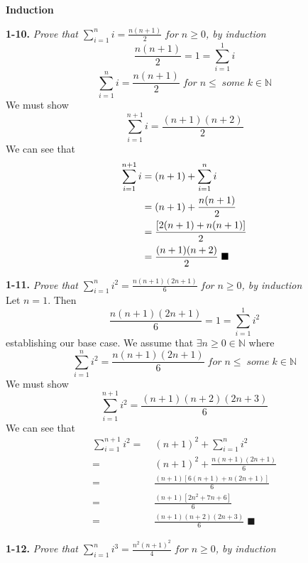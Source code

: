 \textbf{Induction}

\textbf{1-10.} \emph{Prove that $\sum_{i=1}^{n}i=\frac{n(n+1)}{2} \;for\; n \geq 0$, by induction} \\
\textcolor{answer}{
	$$\frac{n(n+1)}{2} = 1 = \sum_{i=1}^{1} i$$
	$$\sum_{i=1}^{n} i = \frac{n(n+1)}{2} \;for\; n \leq \;some\; k \in \mathbb{N}$$
	We must show
	$$\sum_{i=1}^{n+1} i = \frac{(n+1)(n+2)}{2}$$
	We can see that
	\begin{align*}
	\sum_{i=1}^{n+1} i =& \; (n+1) + \sum_{i=1}^{n} i \\
					   =& \; (n+1) + \frac{n(n+1)}{2} \\
					   =& \; \frac{[2(n+1) + n(n+1)]}{2} \\
					   =& \; \frac{(n+1)(n+2)}{2} \;{\color{black}\blacksquare}
	\end{align*}
}




\textbf{1-11.} \emph{Prove that $\sum_{i=1}^{n}i^{2}=\frac{n(n+1)(2n+1)}{6} \;for\; n \geq 0$, by induction} \\
Let $n = 1$. Then
$$\frac{n(n+1)(2n+1)}{6} = 1 = \sum_{i=1}^{1} i^{2}$$
establishing our base case. We assume that $\exists n \geq 0 \in  \mathbb{N}$ where
$$\sum_{i=1}^{n} i^{2} = \frac{n(n+1)(2n+1)}{6} \;for\; n \leq \;some\; k \in \mathbb{N}$$
We must show
$$\sum_{i=1}^{n+1}i^{2}=\frac{(n+1)(n+2)(2n+3)}{6}$$
We can see that
\begin{align*}
\sum_{i=1}^{n+1} i^{2} =& \; (n+1)^{2} + \sum_{i=1}^{n} i^2 \\
					   =& \; (n+1)^{2} + \frac{n(n+1)(2n+1)}{6} \\
					   =& \; \frac{(n+1)[6(n+1) + n(2n+1)]}{6} \\
					   =& \; \frac{(n+1)[2n^{2} + 7n + 6]}{6} \\
					   =& \; \frac{(n+1)(n+2)(2n+3)}{6} \;\blacksquare
\end{align*}


\textbf{1-12.} \emph{Prove that $\sum_{i=1}^{n}i^{3}=\frac{n^{2}(n+1)^{2}}{4} \;for\; n \geq 0$, by induction}  \\

